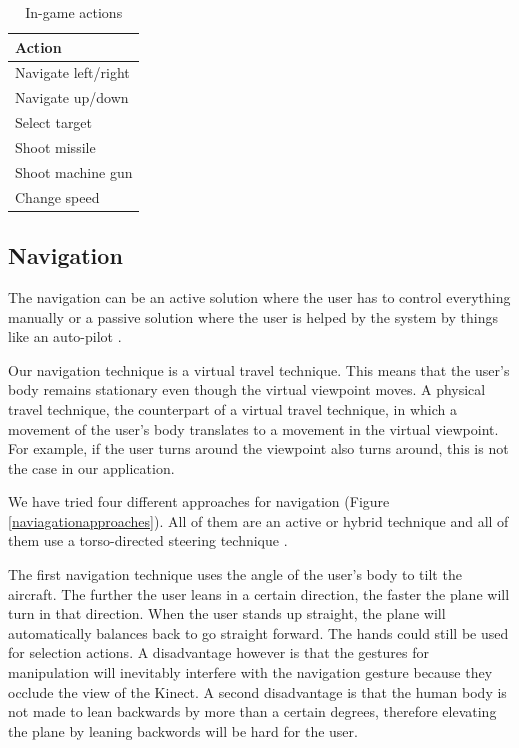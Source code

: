 \documentclass{acm_proc_article-sp}
\begin{document}
\begin{table}
\centering
\caption{In-game actions}
\begin{tabular}{|l|} \hline
\bf{Action} \\ \hline
Navigate left/right\\ \hline
Navigate up/down\\ \hline
Select target \\ \hline
Shoot missile \\ \hline
Shoot machine gun \\ \hline
Change speed \\ \hline
\end{tabular}
\label{tblActions}
\end{table}

\subsection{Navigation}
The navigation can be an active solution where the user has to control everything manually or a passive solution where the user is helped by the system by things like an auto-pilot \cite{bookactivepassive}.

Our navigation technique is a virtual travel technique\cite{bookactivepassive}. This means that the user's body remains stationary even though the virtual viewpoint moves. A physical travel technique, the counterpart of a virtual travel technique, in which a movement of the user's body translates to a movement in the virtual viewpoint. For example, if the user turns around the viewpoint also turns around, this is not the case in our application.

We have tried four different approaches for navigation (Figure \ref{naviagationapproaches}).
All of them are an active or hybrid technique and all of them use a torso-directed steering technique \cite{booktorso}.

The first navigation technique uses the angle of the user's body to tilt the aircraft.
The further the user leans in a certain direction, the faster the plane will turn in that direction.
When the user stands up straight, the plane will automatically balances back to go straight forward.
The hands could still be used for selection actions.
A disadvantage however is that the gestures for manipulation will inevitably interfere with the navigation gesture because they occlude the view of the Kinect. A second disadvantage is that the human body is not made to lean backwards by more than a certain degrees, therefore elevating the plane by leaning backwords will be hard for the user.
\end{document}
